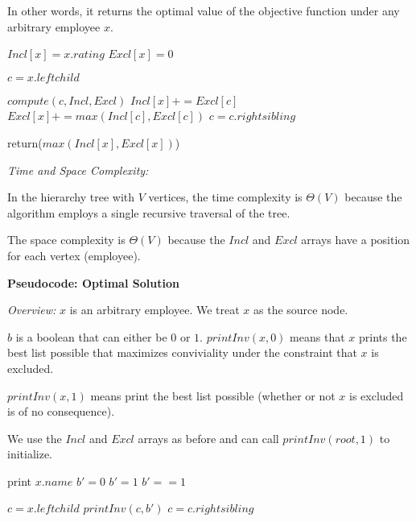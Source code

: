 \documentclass[a4paper]{report}
\begin{document}
\begin{enumerate}
      In other words, it returns the optimal value of the objective function under any arbitrary employee $x$.

      \begin{algorithmic}[1]
          \State $Incl[x] = x.rating$
          \State $Excl[x] = 0$

          \State $c = x.leftchild$

            \State $compute(c, Incl, Excl)$
            \State $Incl[x] += Excl[c]$
            \State $Excl[x] += max(Incl[c], Excl[c])$
            \State $c = c.rightsibling$
          \EndWhile

          \State return($max(Incl[x], Excl[x])$)
        \EndFunction
      \end{algorithmic}

      {\it Time and Space Complexity:}

      In the hierarchy tree with $V$ vertices, the time complexity is $\Theta(V)$ because the algorithm employs
      a single recursive traversal of the tree. 

      The space complexity is $\Theta(V)$ because the $Incl$ and $Excl$ arrays have a position for each vertex (employee).


      {\bf Pseudocode: Optimal Solution}

      {\it Overview:}
      $x$ is an arbitrary employee. We treat $x$ as the source node. 

      $b$ is a boolean that can either be $0$ or $1$. $printInv(x, 0)$ means that $x$ prints
      the best list possible that maximizes conviviality under the constraint that $x$ is excluded. 
      
      $printInv(x, 1)$ means print the best list possible (whether or not $x$ is excluded is of no consequence).

      We use the $Incl$ and $Excl$ arrays as before and can call $printInv(root, 1)$ to initialize. 

      \begin{algorithmic}[1]
              \State print $x.name$
              \State $b' = 0$
            \Else
              \State $b' = 1$
            \EndIf
          \Else
            \State $b' == 1$
          \EndIf

          \State $c = x.leftchild$
            \State $printInv(c, b')$
            \State $c = c.rightsibling$
          \EndWhile
        \EndFunction
      \end{algorithmic}


\end{enumerate}
\end{document}
